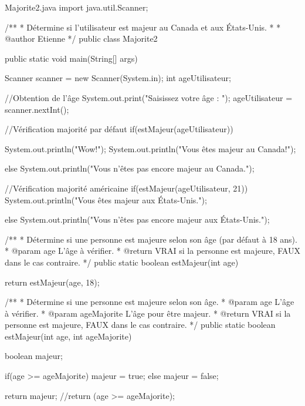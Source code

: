 \documentclass[12pt]{article}
\begin{document}
\begin{MyTCB}{Majorite2.java}
import java.util.Scanner;

/**
 * Détermine si l'utilisateur est majeur au Canada et aux États-Unis.
 * 
 * @author Etienne
 */
public class Majorite2 {

	public static void main(String[] args) {
		
		Scanner scanner = new Scanner(System.in);
		int ageUtilisateur;
		
		//Obtention de l'âge
		System.out.print("Saisissez votre âge : ");
		ageUtilisateur = scanner.nextInt();
		
		//Vérification majorité par défaut
		if(estMajeur(ageUtilisateur)) {
			
			System.out.println("Wow!");
			System.out.println("Vous êtes majeur au Canada!");
			
		}
		else {
			System.out.println("Vous n'êtes pas encore majeur au Canada.");
		}
		
		
		//Vérification majorité américaine
		if(estMajeur(ageUtilisateur, 21))
			System.out.println("Vous êtes majeur aux États-Unis.");
		
		else
			System.out.println("Vous n'êtes pas encore majeur aux États-Unis.");
		
	}
	
	
	/**
	 * Détermine si une personne est majeure selon son âge (par défaut à 18 ans). 
	 * @param age L'âge à vérifier.
	 * @return VRAI si la personne est majeure, FAUX dans le cas contraire.
	 */
	public static boolean estMajeur(int age) {
		
		return estMajeur(age, 18);
		
	}
	
	
	/**
	 * Détermine si une personne est majeure selon son âge.
	 * @param age L'âge à vérifier.
	 * @param ageMajorite L'âge pour être majeur.
	 * @return VRAI si la personne est majeure, FAUX dans le cas contraire.
	 */
	public static boolean estMajeur(int age, int ageMajorite) {
		
		boolean majeur;
		
		if(age >= ageMajorite)
			majeur = true;
		else
			majeur = false;
		
		return majeur; //return (age >= ageMajorite);
		
	}
	
}
\end{MyTCB}
\end{document}

